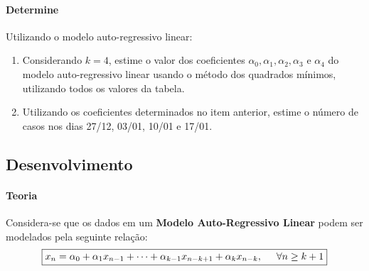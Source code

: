 \documentclass{article}
\begin{document}
            \paragraph{Determine}Utilizando o modelo auto-regressivo linear:
                \begin{enumerate}[noitemsep]
                    \item Considerando $k = 4$, estime o valor dos coeficientes $\alpha_{0}, \alpha_{1}, \alpha_{2}, \alpha_{3}$ e $\alpha_{4}$ do modelo auto-regressivo linear usando o método dos quadrados mínimos, utilizando todos os valores da tabela.
                    \item Utilizando os coeficientes determinados no item anterior, estime o número de casos nos dias 27/12, 03/01, 10/01 e 17/01.
                \end{enumerate}

        \subsection{Desenvolvimento}
            \paragraph{Teoria}Considera-se que os dados em um \textbf{Modelo Auto-Regressivo Linear} podem ser modelados pela seguinte relação:
                \[\boxed{
                    x_{n} = \alpha_{0} + \alpha_{1}x_{n-1} + \cdots + \alpha_{k-1}x_{n-k+1} + \alpha_{k}x_{n-k}, 
                    \hspace{5mm} \forall n\geq k+1}
                \]
\end{document}
